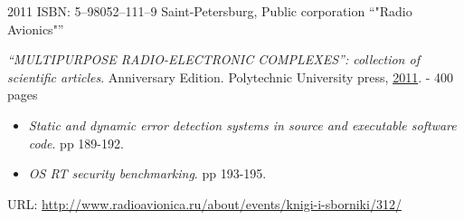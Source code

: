 

\begin{entrylist}
    \entry
    {2011}
    {ISBN: 5–98052–111–9}
    {Saint-Petersburg, Public corporation \enquote{"Radio Avionics"}}
    {\textit{\enquote{MULTIPURPOSE RADIO-ELECTRONIC COMPLEXES}: collection of scientific articles}. Anniversary Edition. Polytechnic University press, \underline{2011}. - 400 pages
    \begin{itemize}
        \item \textit{Static and dynamic error detection systems in source and executable software code}. pp 189-192.
        \item \textit{OS RT security benchmarking}. pp 193-195.
    \end{itemize}
    URL: \url{http://www.radioavionica.ru/about/events/knigi-i-sborniki/312/}
    }
\end{entrylist}
